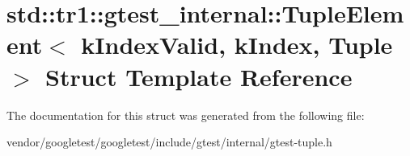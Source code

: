 \hypertarget{structstd_1_1tr1_1_1gtest__internal_1_1TupleElement}{}\section{std\+:\+:tr1\+:\+:gtest\+\_\+internal\+:\+:Tuple\+Element$<$ k\+Index\+Valid, k\+Index, Tuple $>$ Struct Template Reference}
\label{structstd_1_1tr1_1_1gtest__internal_1_1TupleElement}


The documentation for this struct was generated from the following file\+:\begin{DoxyCompactItemize}
\item 
vendor/googletest/googletest/include/gtest/internal/gtest-\/tuple.\+h\end{DoxyCompactItemize}
